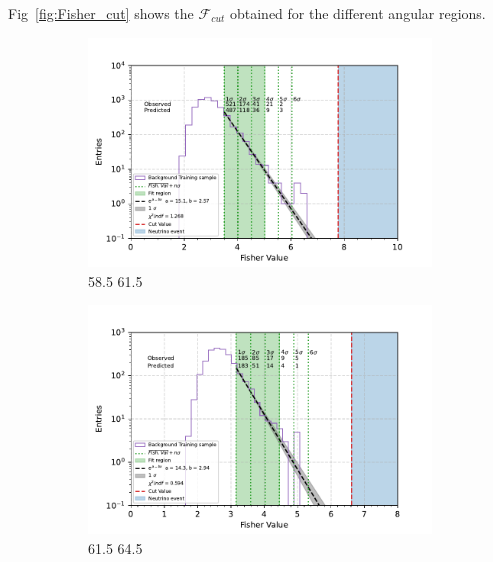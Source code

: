 Fig~\ref{fig:Fisher_cut} shows the $\mathcal{F}_{cut}$ obtained for the different angular regions. 
\begin{figure}[h!]
  \centering
   \begin{subfigure}[l]{.48\textwidth}
     \centering
     \includegraphics[width=\linewidth]{thesis_figures/Nu_analysis/Fisher_plots/Fisher_fit_region_58.5_61.5.pdf}
     \caption{58.5 61.5}
     \label{fig:GEM1_after_prev}
   \end{subfigure}
   \begin{subfigure}[r]{.48\textwidth}
     \centering
     \includegraphics[width=\linewidth]{thesis_figures/Nu_analysis/Fisher_plots/Fisher_fit_region_61.5_64.5.pdf}
     \caption{61.5 64.5}
    \end{subfigure}
    \hfill
    \begin{subfigure}[l]{.48\textwidth}
      \centering

\end{subfigure}
\end{figure}
